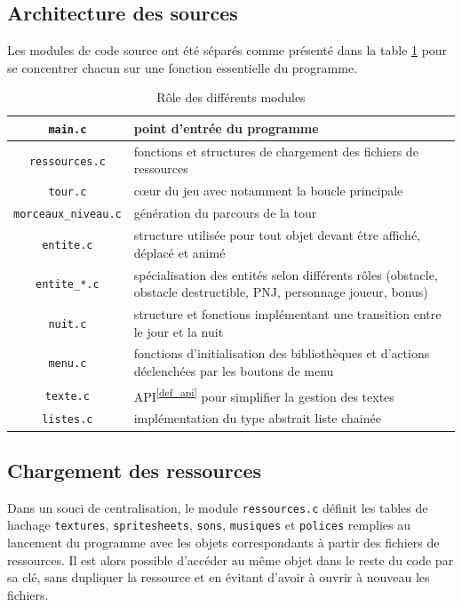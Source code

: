 \documentclass[a4paper,12pt]{article}
\newcommand\refsuscrite[1]{\textsuperscript{\ref{#1}}}
\begin{document}
\subsection{Architecture des sources}

Les modules de code source ont été séparés comme présenté dans la table \ref{table_archi} pour se concentrer chacun sur une fonction essentielle du programme.

\begin{table}[H]
    \centering
    \begin{tabular}{c p{}}
	\toprule
	\texttt{main.c}			    & point d’entrée du programme	\\
	\midrule
	\texttt{ressources.c}		    & fonctions et structures de chargement des fichiers de ressources	\\
	\midrule
	\texttt{tour.c}			    & cœur du jeu avec notamment la boucle principale	\\
	\midrule
        \texttt{morceaux\_niveau.c}	    & génération du parcours de la tour \\
	\midrule
	\texttt{entite.c}                   & structure utilisée pour tout objet devant être affiché, déplacé et animé  \\
	\midrule
        \texttt{entite\_*.c}                & spécialisation des entités selon différents rôles (obstacle, obstacle destructible, PNJ, personnage joueur, bonus)  \\
	\midrule
	\texttt{nuit.c}			    & structure et fonctions implémentant une transition entre le jour et la nuit \\
	\midrule
	\texttt{menu.c} 		    & fonctions d’initialisation des bibliothèques et d’actions déclenchées par les boutons de menu \\
	\midrule
	\texttt{texte.c}		    & API\refsuscrite{def_api} pour simplifier la gestion des textes   \\
	\midrule
	\texttt{listes.c}		    & implémentation du type abstrait liste chainée \\
	\bottomrule
    \end{tabular}
    \caption{Rôle des différents modules}
    \label{table_archi}
\end{table}

\subsection{Chargement des ressources}

Dans un souci de centralisation, le module \texttt{ressources.c} définit les tables de hachage \texttt{textures}, \texttt{spritesheets}, \texttt{sons}, \texttt{musiques} et \texttt{polices} remplies au lancement du programme avec les objets correspondants à partir des fichiers de ressources.
Il est alors possible d’accéder au même objet dans le reste du code par sa clé, sans dupliquer la ressource et en évitant d’avoir à ouvrir à nouveau les fichiers.
\end{document}
